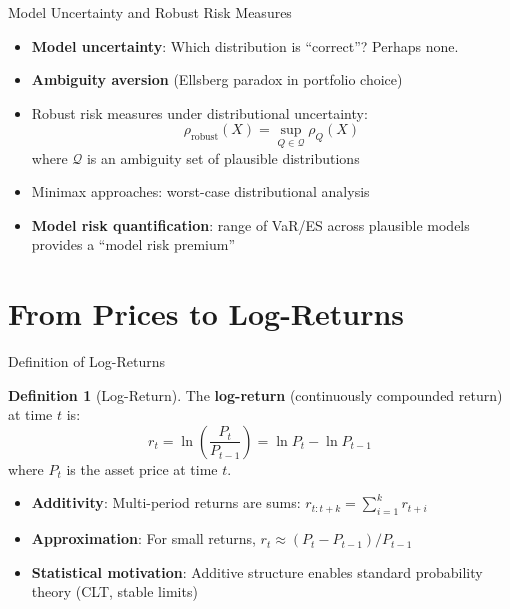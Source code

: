 \documentclass[9pt, aspectratio=169, t]{beamer}
\theoremstyle{definition}
\newtheorem{defn}{Definition}
\begin{document}
\begin{frame}{Model Uncertainty and Robust Risk Measures}
\begin{itemize}
\item \textbf{Model uncertainty}: Which distribution is ``correct''? Perhaps none.
\item \textbf{Ambiguity aversion} (Ellsberg paradox in portfolio choice)
\item Robust risk measures under distributional uncertainty:
\[
\rho_{\text{robust}}(X) = \sup_{Q \in \mathcal{Q}} \rho_Q(X)
\]
where $\mathcal{Q}$ is an ambiguity set of plausible distributions
\item Minimax approaches: worst-case distributional analysis
\item \textbf{Model risk quantification}: range of VaR/ES across plausible models provides a ``model risk premium''
\end{itemize}
\end{frame}

\section{From Prices to Log-Returns}

\begin{frame}{Definition of Log-Returns}
\begin{defn}[Log-Return]
The \textbf{log-return} (continuously compounded return) at time $t$ is:
\[
r_t = \ln\!\left(\frac{P_t}{P_{t-1}}\right) = \ln P_t - \ln P_{t-1}
\]
where $P_t$ is the asset price at time $t$.
\end{defn}

\vspace{0.2cm}
\begin{itemize}
\item \textbf{Additivity}: Multi-period returns are sums: $r_{t:t+k} = \sum_{i=1}^{k} r_{t+i}$
\item \textbf{Approximation}: For small returns, $r_t \approx (P_t - P_{t-1})/P_{t-1}$
\item \textbf{Statistical motivation}: Additive structure enables standard probability theory (CLT, stable limits)
\end{itemize}
\end{frame}
\end{document}
